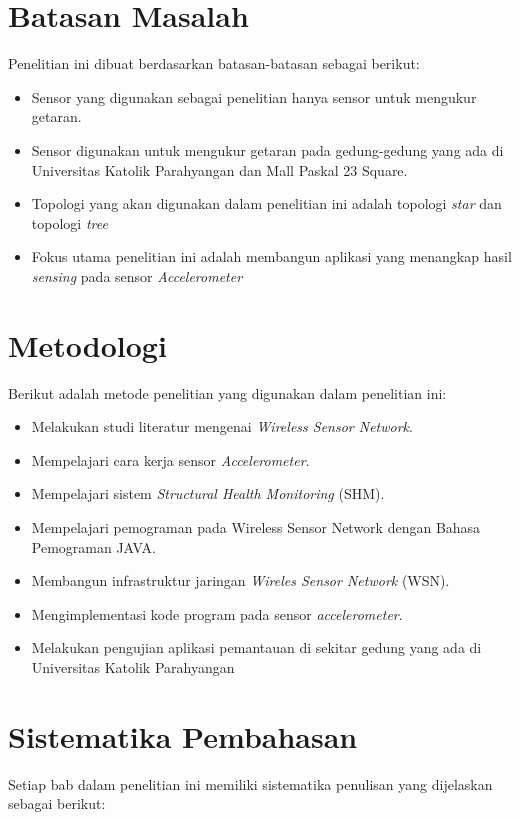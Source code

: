 \section{Batasan Masalah}
\label{sec:batasan}
Penelitian ini dibuat berdasarkan batasan-batasan sebagai berikut:
\begin{itemize}
	\item Sensor yang digunakan sebagai penelitian hanya sensor untuk mengukur getaran.
	\item Sensor digunakan untuk mengukur getaran pada gedung-gedung yang ada di Universitas Katolik Parahyangan dan Mall Paskal 23 Square. 
	\item Topologi yang akan digunakan dalam penelitian ini adalah topologi \textit{star} dan topologi \textit{tree}
	\item Fokus utama penelitian ini adalah membangun aplikasi yang menangkap hasil \textit{sensing} pada sensor \textit{Accelerometer}
\end{itemize}


\section{Metodologi}
\label{sec:metlit}
Berikut adalah metode penelitian yang digunakan dalam penelitian ini:
\begin{itemize}
	\item Melakukan studi literatur mengenai \textit{Wireless Sensor Network}.
	\item Mempelajari cara kerja sensor \textit{Accelerometer}.
	\item Mempelajari sistem \textit{Structural Health Monitoring} (SHM).
	\item Mempelajari pemograman pada Wireless Sensor Network dengan Bahasa Pemograman JAVA.
	\item Membangun infrastruktur jaringan \textit{Wireles Sensor Network} (WSN).
	\item Mengimplementasi kode program pada sensor \textit{accelerometer}.
	\item Melakukan pengujian aplikasi pemantauan di sekitar gedung yang ada di Universitas Katolik Parahyangan 
\end{itemize}

\section{Sistematika Pembahasan}
\label{sec:sispem}
Setiap bab dalam penelitian ini memiliki sistematika penulisan yang dijelaskan sebagai berikut:
